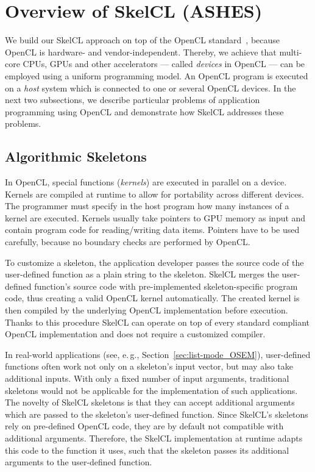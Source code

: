 \section{Overview of SkelCL (ASHES)} 

We build our SkelCL approach on top of the OpenCL standard~\cite{OpenCL-11}, because OpenCL is hardware- and vendor-independent.
Thereby, we achieve that multi-core CPUs, GPUs and other accelerators --- called \emph{devices} in OpenCL --- can be employed using a uniform programming model.
An OpenCL program is executed on a \emph{host} system which is connected to one or several OpenCL devices.
In the next two subsections, we describe particular problems of application programming using OpenCL and demonstrate how SkelCL addresses these problems.

\subsection{Algorithmic Skeletons}

In OpenCL, special functions (\emph{kernels}) are executed in parallel on a device.
Kernels are compiled at runtime to allow for portability across different devices.
The programmer must specify in the host program how many instances of a kernel are executed.
Kernels usually take pointers to GPU memory as input and contain program code for reading/writing data items.
Pointers have to be used carefully, because no boundary checks are performed by OpenCL.

To customize a skeleton, the application developer passes the source code of the user-defined function as a plain string to the skeleton.
SkelCL merges the user-defined function's source code with pre-implemented skeleton-specific program code, thus creating a valid OpenCL kernel automatically.
The created kernel is then compiled by the underlying OpenCL implementation before execution.
Thanks to this procedure SkelCL can operate on top of every standard compliant OpenCL implementation and does not require a customized compiler.

In real-world applications (see, e.\,g., Section~\ref{sec:list-mode_OSEM}), user-defined functions often work not only on a skeleton's input vector, but may also take additional inputs.
With only a fixed number of input arguments, traditional skeletons would not be applicable for the implementation of such applications.
The novelty of SkelCL skeletons is that they can accept additional arguments which are passed to the skeleton's user-defined function.
Since SkelCL's skeletons rely on pre-defined OpenCL code, they are by default not compatible with additional arguments.
Therefore, the SkelCL implementation at runtime adapts this code to the function it uses, such that the skeleton passes its additional arguments to the user-defined function.

